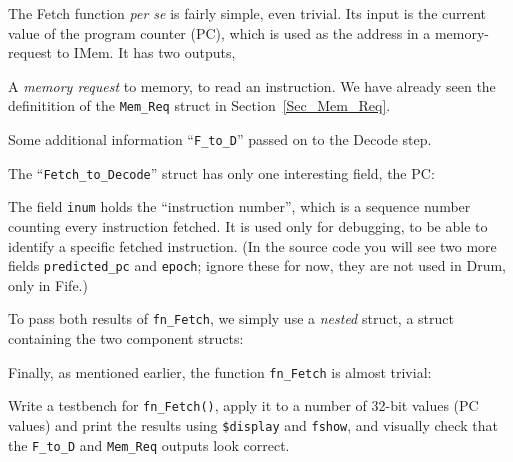 
The Fetch function \emph{per se} is fairly simple, even trivial.  Its
input is the current value of the program counter (PC), which is used
as the address in a memory-request to IMem.  It has two outputs,

\begin{tightlist}

 \item A \emph{memory request} to memory, to read an instruction.  We
       have already seen the definitition of the \verb|Mem_Req| struct
       in Section~\ref{Sec_Mem_Req}.

 \item Some additional information ``\verb|F_to_D|'' passed on to the
       Decode step.

\end{tightlist}

The ``\verb|Fetch_to_Decode|'' struct has only one interesting field,
the PC:



The field \verb|inum| holds the ``instruction number'', which is a
sequence number counting every instruction fetched.  It is used only
for debugging, to be able to identify a specific fetched instruction.
(In the source code you will see two more fields \verb|predicted_pc|
and \verb|epoch|; ignore these for now, they are not used in Drum,
only in Fife.)


To pass both results of \verb|fn_Fetch|, we simply use a \emph{nested}
struct, {\ie} a struct containing the two component structs:



Finally, as mentioned earlier, the function \verb|fn_Fetch| is almost
trivial:




\hdivider

\Exercise

Write a testbench for \verb|fn_Fetch()|, apply it to a number of
32-bit values (PC values) and print the results using \verb|$display|
and \verb|fshow|, and visually check that the \verb|F_to_D| and
\verb|Mem_Req| outputs look correct.

